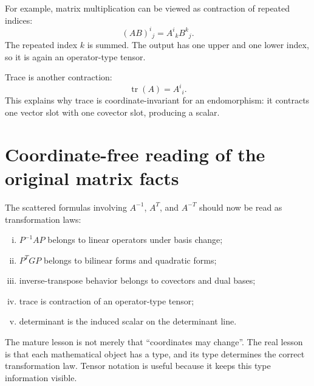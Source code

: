 For example, matrix multiplication can be viewed as contraction of repeated indices:
\[
  (AB)^i{}_j=A^i{}_kB^k{}_j.
\]
The repeated index \(k\) is summed.  The output has one upper and one lower index, so it is again an operator-type tensor.

Trace is another contraction:
\[
  \operatorname{tr}(A)=A^i{}_i.
\]
This explains why trace is coordinate-invariant for an endomorphism: it contracts one vector slot with one covector slot, producing a scalar.

\section{Coordinate-free reading of the original matrix facts}

The scattered formulas involving \(A^{-1}\), \(A^T\), and \(A^{-T}\) should now be read as transformation laws:
\begin{enumerate}[(i)]
  \item \(P^{-1}AP\) belongs to linear operators under basis change;
  \item \(P^TGP\) belongs to bilinear forms and quadratic forms;
  \item inverse-transpose behavior belongs to covectors and dual bases;
  \item trace is contraction of an operator-type tensor;
  \item determinant is the induced scalar on the determinant line.
\end{enumerate}

The mature lesson is not merely that ``coordinates may change''.  The real lesson is that each mathematical object has a type, and its type determines the correct transformation law.  Tensor notation is useful because it keeps this type information visible.

